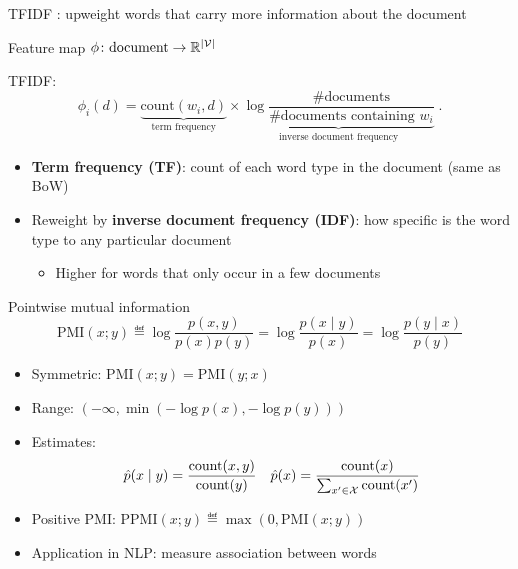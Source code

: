 \documentclass[usenames,dvipsnames,notes,11pt,aspectratio=169]{beamer}
\begin{document}
\begin{frame}
    {TFIDF}
    : upweight words that carry more information about the document

    Feature map $\phi\colon \text{document} \rightarrow \mathbb{R}^{|\mathcal{V}|}$

    TFIDF:\\
    $$
    \phi_i(d) = \underbrace{\text{count}(w_i, d)}_{\textstyle \text{term frequency}} \times
    \underbrace{\log \frac{\text{\# documents}}{\textstyle\text{\# documents containing $w_i$}}}_{\textstyle \text{inverse document frequency}}
    \;.
    $$

    \begin{itemize}
        \item \textbf{Term frequency (TF)}: count of each word type in the document (same as BoW)
        \item Reweight by \textbf{inverse document frequency (IDF)}: how specific is the word type to any particular document 
            \begin{itemize}
                \item Higher for words that only occur in a few documents
            \end{itemize}
    \end{itemize}

\end{frame}

\begin{frame}
    {Pointwise mutual information}
    $$
    \text{PMI}(x;y) \eqdef \log \frac{p(x,y)}{p(x)p(y)}
    = \log\frac{p(x\mid y)}{p(x)}
    = \log\frac{p(y\mid x)}{p(y)}
    $$
    \vspace{-1em}
    \begin{itemize}
        \itemsep1em
        \item Symmetric: $\text{PMI}(x;y)=\text{PMI}(y;x)$
        \item Range: $(-\infty, \min(-\log p(x), -\log p(y)))$
        \item Estimates:
            \begin{align*}
            \hat{p}(x\mid y) = \frac{\text{count}(x,y)}{\text{count}(y)}\quad
            \hat{p}(x) = \frac{\text{count}(x)}{\sum_{x'\in\mathcal{X}}\text{count}(x')}
            \end{align*}
        \item Positive PMI: $\text{PPMI}(x;y) \eqdef \max(0, \text{PMI}(x;y))$
        \item Application in NLP: measure association between words 
    \end{itemize}
\end{frame}
\end{document}
